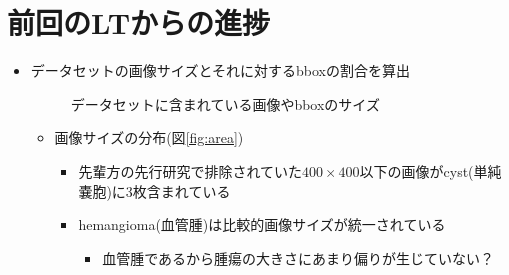 \documentclass[a4j]{ujarticle}
\newcommand{\Fref}[1]{\mbox{図\ref{fig:#1}}}
\begin{document}
    \section{前回のLTからの進捗}
        \begin{itemize}
            \item データセットの画像サイズとそれに対するbboxの割合を算出
            \begin{figure}[h]
                \centering
                \caption{データセットに含まれている画像やbboxのサイズ}
            \end{figure}
            \begin{itemize}
                \item 画像サイズの分布(\Fref{area})
                \begin{itemize}
                    \item 先輩方の先行研究で排除されていた$400 \times 400$以下の画像がcyst(単純嚢胞)に3枚含まれている
                    \item hemangioma(血管腫)は比較的画像サイズが統一されている
                    \begin{itemize}
                        \item 血管腫であるから腫瘍の大きさにあまり偏りが生じていない？
                    \end{itemize}
                \end{itemize}

\end{itemize}
\end{itemize}
\end{document}
